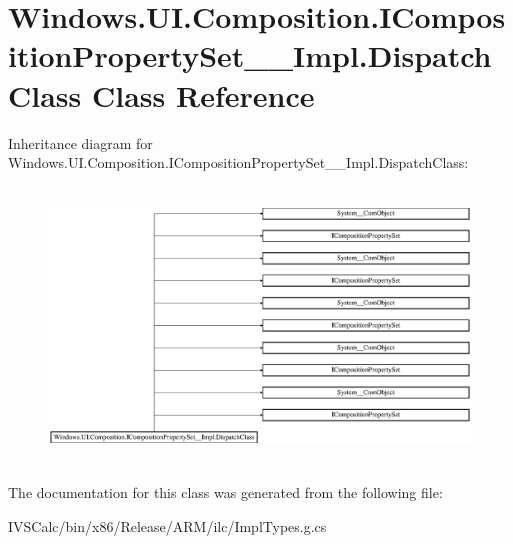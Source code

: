 \hypertarget{class_windows_1_1_u_i_1_1_composition_1_1_i_composition_property_set_____impl_1_1_dispatch_class}{}\section{Windows.\+U\+I.\+Composition.\+I\+Composition\+Property\+Set\+\_\+\+\_\+\+Impl.\+Dispatch\+Class Class Reference}
\label{class_windows_1_1_u_i_1_1_composition_1_1_i_composition_property_set_____impl_1_1_dispatch_class}
Inheritance diagram for Windows.\+U\+I.\+Composition.\+I\+Composition\+Property\+Set\+\_\+\+\_\+\+Impl.\+Dispatch\+Class\+:\begin{figure}[H]
\begin{center}
\leavevmode
\includegraphics[height=7.350835cm]{class_windows_1_1_u_i_1_1_composition_1_1_i_composition_property_set_____impl_1_1_dispatch_class}
\end{center}
\end{figure}


The documentation for this class was generated from the following file\+:\begin{DoxyCompactItemize}
\item 
I\+V\+S\+Calc/bin/x86/\+Release/\+A\+R\+M/ilc/Impl\+Types.\+g.\+cs\end{DoxyCompactItemize}
